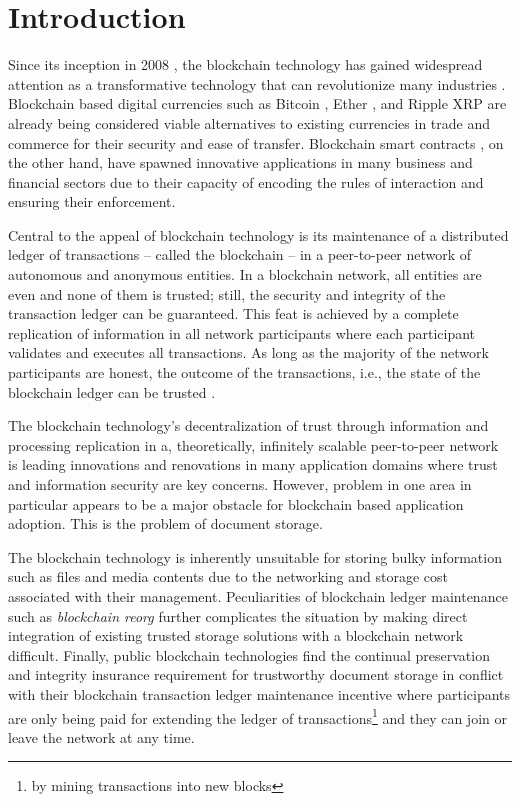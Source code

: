 \section{Introduction}
\label{s-intro}
Since its inception in 2008 \cite{bitcoin}, the blockchain technology has gained widespread attention as a transformative technology that can revolutionize many industries \cite{deloitte}. Blockchain based digital currencies such as Bitcoin \cite{bitcoin}, Ether \cite{Wood2014EthereumAS}, and Ripple XRP \cite{David2014TheRP} are already being considered viable alternatives to existing currencies in trade and commerce for their security and ease of transfer. Blockchain smart contracts \cite{FM548} \cite{Wood2014EthereumAS}, on the other hand, have spawned innovative applications in many business and financial sectors due to their capacity of encoding the rules of interaction and ensuring their enforcement.

Central to the appeal of blockchain technology is its maintenance of a distributed ledger of transactions --  called the blockchain -- in a peer-to-peer network of autonomous and anonymous entities. In a blockchain network, all entities are even and none of them is trusted; still, the security and integrity of the transaction ledger can be guaranteed. This feat is achieved by a complete replication of information in all network participants where each participant validates and executes all transactions. As long as the majority of the network participants are honest, the outcome of the transactions, i.e., the state of the blockchain ledger can be trusted \cite{10.1007/978-3-319-56614-6_22}.

The blockchain technology's decentralization of trust through information and processing replication in a, theoretically, infinitely scalable peer-to-peer network is leading innovations and renovations in many application domains where trust and information security are key concerns. However, problem in one area in particular appears to be a major obstacle for blockchain based application adoption. This is the problem of document storage. 

The blockchain technology is inherently unsuitable for storing bulky information such as files and media contents due to the networking and storage cost associated with their management. Peculiarities of blockchain ledger maintenance such as \textit{blockchain reorg} \cite{reorg} further complicates the situation by making direct integration of existing trusted storage solutions with a blockchain network difficult. Finally, public blockchain technologies find the continual preservation and integrity insurance requirement for trustworthy document storage in conflict with their blockchain transaction ledger maintenance incentive where participants are only being paid for extending the ledger of transactions\footnote{by mining transactions into new blocks} and they can join or leave the network at any time.      


